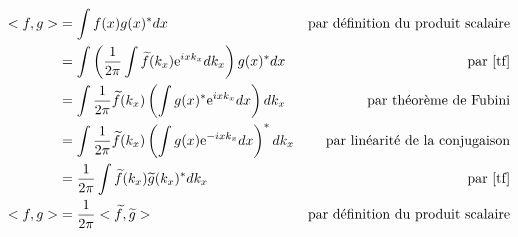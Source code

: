 \begin{align*}
<f,g>	&	= \Int f(x)g(x)^\ast dx	&	\text{par définition du produit scalaire}\\
  &	= \Int \lc\f[1]{2\pi}\Int \t{f}(k_x)\e^{ixk_x}dk_x\rc g(x)^\ast dx	&	\text{par \eqref{tf}}\\
  &	= \Int \f[1]{2\pi}\t{f}(k_x)\lc\Int g(x)^\ast \e^{ixk_x}dx\rc dk_x	&	\text{par théorème de Fubini}\\
  &	= \Int \f[1]{2\pi}\t{f}(k_x)\lc\Int g(x) \e^{-ixk_x}dx\rc^\ast dk_x	&
  \text{par linéarité de la conjugaison}\\
  &	= \f[1]{2\pi}\Int\t{f}(k_x)\t{g}(k_x)^\ast dk_x	&	\text{par \eqref{tf}}\\
<f,g>	&	= \f[1]{2\pi}<\t{f},\t{g}>	&	\text{par définition du produit scalaire}
\end{align*}


\newpage
